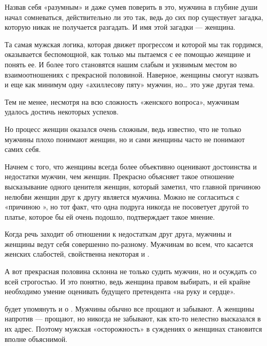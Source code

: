 Назвав себя «разумным» и даже сумев поверить в это, мужчина в глубине души начал сомневаться, действительно ли это так, ведь до сих пор существует загадка, которую никак не получается разгадать. И имя этой загадки --- женщина.

Та самая мужская логика, которая движет прогрессом и которой мы так гордимся, оказывается беспомощной, как только мы пытаемся с ее помощью  женщине и понять ее. И более того  становятся нашим слабым и уязвимым местом во взаимоотношениях с прекрасной половиной. Наверное, женщины смогут назвать и еще как минимум одну «ахиллесову пяту» мужчин, но… это уже другая тема.

Тем не менее, несмотря на всю сложность «женского вопроса», мужчинам удалось достичь некоторых успехов.

Но процесс  женщин оказался очень сложным, ведь известно, что не только мужчины плохо понимают женщин, но и сами женщины часто не понимают самих себя.

Начнем с того, что женщины всегда более объективно оценивают достоинства и недостатки мужчин, чем женщин. Прекрасно объясняет такое  отношение высказывание одного ценителя женщин, который заметил, что главной причиною нелюбви женщин друг к другу является мужчина. Можно не согласиться с «причиною », но тот факт, что одна подруга никогда не посоветует другой то платье, которое бы ей очень подошло,  подтверждает такое мнение.

Когда речь заходит об отношении к недостаткам друг друга, мужчины и женщины ведут себя совершенно по-разному. Мужчинам во всем, что касается женских слабостей, свойственна некоторая  и .

А вот прекрасная половина склонна не только судить мужчин, но и осуждать со всей строгостью. И это понятно, ведь женщина  правом выбирать, и ей крайне необходимо умение оценивать будущего претендента «на руку и сердце».

 будет упомянуть и о . Мужчины обычно все прощают и забывают. А женщины напротив --- прощают, но никогда не забывают, как кто-то нелестно высказался в их адрес. Поэтому мужская «осторожность» в суждениях о женщинах становится вполне объяснимой.

